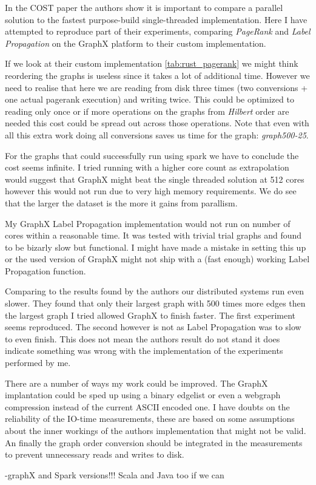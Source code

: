 In the COST paper the authors show it is important to compare a parallel solution to the fastest purpose-build single-threaded implementation. Here I have attempted to reproduce part of their experiments, comparing \textit{PageRank} and \textit{Label Propagation} on the GraphX platform to their custom implementation.

If we look at their custom implementation \cref{tab:rust_pagerank} we might think reordering the graphs is useless since it takes a lot of additional time. However we need to realise that here we are reading from disk three times (two conversions + one actual pagerank execution) and writing twice. This could be optimized to reading only once or if more operations on the graphs from \textit{Hilbert} order are needed this cost could be spread out across those operations. Note that even with all this extra work doing all conversions saves us time for the graph: \textit{graph500-25}.

For the graphs that could successfully run using spark we have to conclude the cost seems infinite. I tried running with a higher core count as extrapolation would suggest that GraphX might beat the single threaded solution at 512 cores however this would not run due to very high memory requirements. We do see that the larger the dataset is the more it gains from parallism. 

My GraphX Label Propagation implementation would not run on number of cores within a reasonable time. It was tested with trivial trial graphs and found to be bizarly slow but functional. I might have made a mistake in setting this up or the used version of GraphX might not ship with a (fast enough) working Label Propagation function. 

Comparing to the results found by the authors \cite{189908} our distributed systems run even slower. They found that only their largest graph with 500 times more edges then the largest graph I tried allowed GraphX to finish faster. The first experiment seems reproduced. The second however is not as Label Propagation was to slow to even finish. This does not mean the authors result do not stand it does indicate something was wrong with the implementation of the experiments performed by me.

There are a number of ways my work could be improved. The GraphX implantation could be sped up using a binary edgelist or even a webgraph compression\cite{webgraph} instead of the current ASCII encoded one. I have doubts on the reliability of the IO-time measurements, these are based on some assumptions about the inner workings of the authors implementation that might not be valid. An finally the graph order conversion should be integrated in the measurements to prevent unnecessary reads and writes to disk.

-graphX and Spark versions!!!  Scala and Java too if we can
